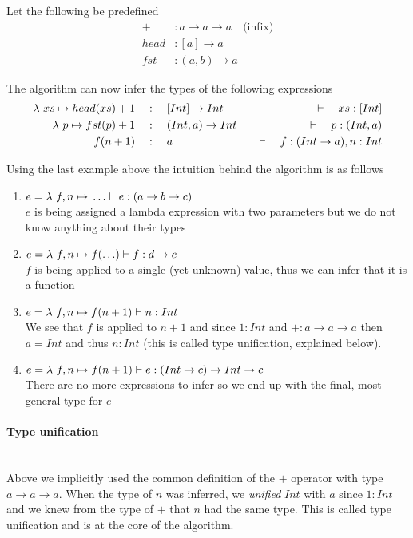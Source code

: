 Let the following be predefined
\begin{align*}
  +      & : a \to a \to a   \quad\text{(infix)}\\
  head   & : [a] \to a   \\
  fst    & : (a, b) \to a
\end{align*}

The algorithm can now infer the types of the following expressions
\begin{align*}
  \lambda{} \ xs \mapsto{} head(xs) + 1 & \quad:\quad [Int] \to Int    & \quad\vdash\quad xs : [Int]             \\
  \lambda{} \ p \mapsto{} fst(p) + 1    & \quad:\quad (Int, a) \to Int & \quad\vdash\quad p : (Int, a)           \\
  f(n + 1)              & \quad:\quad a                & \quad\vdash\quad f: (Int \to a), n: Int \\
\end{align*}

Using the last example above the intuition behind the algorithm is as follows

\begin{enumerate}
\item $e = \lambda{} \ f, n \mapsto{} \ldots \vdash e: (a \to b \to c)$ \\
  $e$ is being assigned a lambda expression with two parameters but we do not know anything about their types
\item $e = \lambda{} \ f, n \mapsto{} f(\ldots) \vdash f: d \to c$ \\
  $f$ is being applied to a single (yet unknown) value, thus we can infer that it is a function
\item $e = \lambda{} \ f, n \mapsto{} f(n + 1) \vdash n : Int$ \\
  We see that $f$ is applied to $n+1$ and since $1: Int$ and $+:a \to a \to a$ then $a = Int$ and thus $n:Int$ (this is called type unification, explained below).
\item $e = \lambda{} \ f, n \mapsto{} f(n + 1) \vdash e : (Int \to c) \to Int \to c$ \\
  There are no more expressions to infer so we end up with the final, most general type for $e$
\end{enumerate}


\paragraph{Type unification}\ \\
Above we implicitly used the common definition of the $+$ operator with type $a \to a \to a$. When the type of $n$ was inferred, we \emph{unified} $Int$ with $a$ since $1 : Int$ and we knew from the type of $+$ that $n$ had the same type. This is called type unification and is at the core of the algorithm.

